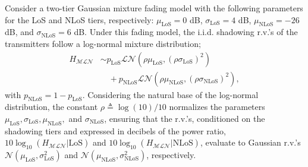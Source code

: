 \documentclass[lettersize,journal]{IEEEtran}
\begin{document}
Consider a two-tier Gaussian mixture fading model with the following parameters for the LoS and NLoS tiers, respectively: $\mu_{\text{LoS}} = 0$ dB, $\sigma_{\text{LoS}} = 4$ dB, $\mu_{\text{NLoS}} = -26$ dB, and $\sigma_{\text{NLoS}} = 6$ dB. Under this fading model, the i.i.d. shadowing r.v.'s of the transmitters follow a log-normal mixture distribution;
\begin{align}
  \label{eq:tier2lognormal}
  H_{\mathcal{M}\mathcal{L}\mathcal{N}} &\sim p_{\text{LoS}} \mathcal{L}\mathcal{N}(\rho \mu_{\text{LoS}}, (\rho \sigma_{\text{LoS}})^2) \nonumber \\
  &\quad + p_{\text{NLoS}} \mathcal{L}\mathcal{N}(\rho \mu_{\text{NLoS}}, (\rho \sigma_{\text{NLoS}})^2),
\end{align}
with $p_{\text{NLoS}} = 1 - p_{\text{LoS}}$. Considering the natural base of the log-normal distribution, the constant $\rho \triangleq \log(10)/10$ normalizes the parameters $\mu_{\text{LoS}}, \sigma_{\text{LoS}}, \mu_{\text{NLoS}},$ and $\sigma_{\text{NLoS}}$, ensuring that the r.v.'s, conditioned on the shadowing tiers and expressed in decibels of the power ratio, $10 \log_{10}(H_{\mathcal{MLN}}|\text{LoS})$ and $10 \log_{10}(H_{\mathcal{MLN}}|\text{NLoS})$, evaluate to Gaussian r.v.'s $\mathcal{N}(\mu_{\text{LoS}}, \sigma_{\text{LoS}}^2)$ and $\mathcal{N}(\mu_{\text{NLoS}}, \sigma_{\text{NLoS}}^2)$, respectively.
\end{document}
